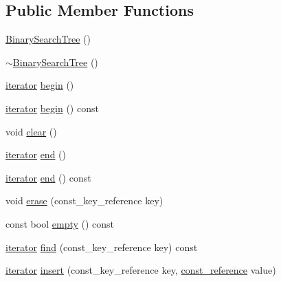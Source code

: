 \subsection*{Public Member Functions}
\begin{DoxyCompactItemize}
\item 
\hyperlink{classprism_1_1_binary_search_tree_a5aac58388c15e1b8bf15f7a18fff2027}{Binary\+Search\+Tree} ()
\item 
\hyperlink{classprism_1_1_binary_search_tree_ad8e02e707d90076bdb0de1728d22ff46}{$\sim$\+Binary\+Search\+Tree} ()
\item 
\hyperlink{classprism_1_1_binary_search_tree_a8c8deaa4e3617d5833c20970ffaa0348}{iterator} \hyperlink{classprism_1_1_binary_search_tree_af2ccdb9d334119a433ae95c747a3f150}{begin} ()
\item 
\hyperlink{classprism_1_1_binary_search_tree_a8c8deaa4e3617d5833c20970ffaa0348}{iterator} \hyperlink{classprism_1_1_binary_search_tree_afd834d15ab003394ce51010dcc93e8be}{begin} () const 
\item 
void \hyperlink{classprism_1_1_binary_search_tree_a014cbb1184b3028fdd0407301bdf6478}{clear} ()
\item 
\hyperlink{classprism_1_1_binary_search_tree_a8c8deaa4e3617d5833c20970ffaa0348}{iterator} \hyperlink{classprism_1_1_binary_search_tree_a2de56890b320d3ccbc099793cc85dc21}{end} ()
\item 
\hyperlink{classprism_1_1_binary_search_tree_a8c8deaa4e3617d5833c20970ffaa0348}{iterator} \hyperlink{classprism_1_1_binary_search_tree_abbdcd3785b09b1cd48b59f4105738f39}{end} () const 
\item 
void \hyperlink{classprism_1_1_binary_search_tree_a4c48d5b2002d877b7b4e4c0d52e4ed4b}{erase} (const\+\_\+key\+\_\+reference key)
\item 
const bool \hyperlink{classprism_1_1_binary_search_tree_aa9901f5ab3c87a79ed21d39691039061}{empty} () const 
\item 
\hyperlink{classprism_1_1_binary_search_tree_a8c8deaa4e3617d5833c20970ffaa0348}{iterator} \hyperlink{classprism_1_1_binary_search_tree_ae00a5f2d879ba5c08ff024c27c34d055}{find} (const\+\_\+key\+\_\+reference key) const 
\item 
\hyperlink{classprism_1_1_binary_search_tree_a8c8deaa4e3617d5833c20970ffaa0348}{iterator} \hyperlink{classprism_1_1_binary_search_tree_a223c125c5803c543281606c576cc3246}{insert} (const\+\_\+key\+\_\+reference key, \hyperlink{classprism_1_1_binary_search_tree_aab75e547e4f5dd8e7f1518ec7b200937}{const\+\_\+reference} value)

\end{DoxyCompactItemize}
